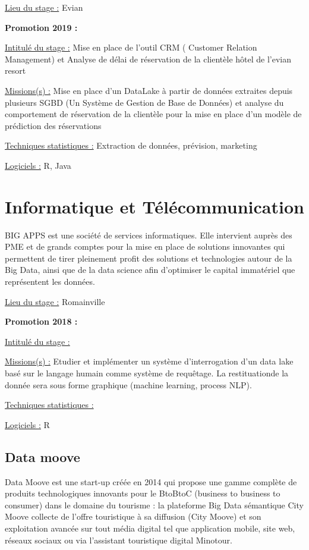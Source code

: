 \documentclass[
  letterpaper,
  DIV=11,
  numbers=noendperiod]{scrreprt}
\begin{document}
\uline{Lieu du stage :} Evian

\textbf{Promotion 2019 :}

\uline{Intitulé du stage :} Mise en place de l'outil CRM ( Customer
Relation Management) et Analyse de délai de réservation de la clientèle
hôtel de l'evian resort

\uline{Missions(s) :} Mise en place d'un DataLake à partir de données
extraites depuis plusieurs SGBD (Un Système de Gestion de Base de
Données) et analyse du comportement de réservation de la clientèle pour
la mise en place d'un modèle de prédiction des réservations

\uline{Techniques statistiques :} Extraction de données, prévision,
marketing

\uline{Logiciels :} R, Java


\hypertarget{informatique-et-tuxe9luxe9communication}{%
\chapter{Informatique et
Télécommunication}\label{informatique-et-tuxe9luxe9communication}}

BIG APPS est une société de services informatiques. Elle intervient
auprès des PME et de grands comptes pour la mise en place de solutions
innovantes qui permettent de tirer pleinement profit des solutions et
technologies autour de la Big Data, ainsi que de la data science afin
d'optimiser le capital immatériel que représentent les données.

\uline{Lieu du stage :} Romainville

\textbf{Promotion 2018 :}

\uline{Intitulé du stage :}

\uline{Missions(s) :} Etudier et implémenter un système d'interrogation
d'un data lake basé sur le langage humain comme système de requêtage. La
restituationde la donnée sera sous forme graphique (machine learning,
process NLP).

\uline{Techniques statistiques :}

\uline{Logiciels :} R

\hypertarget{data-moove}{%
\section{\texorpdfstring{\textbf{Data
moove}}{Data moove}}\label{data-moove}}

Data Moove est une start-up créée en 2014 qui propose une gamme complète
de produits technologiques innovants pour le BtoBtoC (business to
business to consumer) dans le domaine du tourisme : la plateforme Big
Data sémantique City Moove collecte de l'offre touristique à sa
diffusion (City Moove) et son exploitation avancée sur tout média
digital tel que application mobile, site web, réseaux sociaux ou via
l'assistant touristique digital Minotour.
\end{document}
